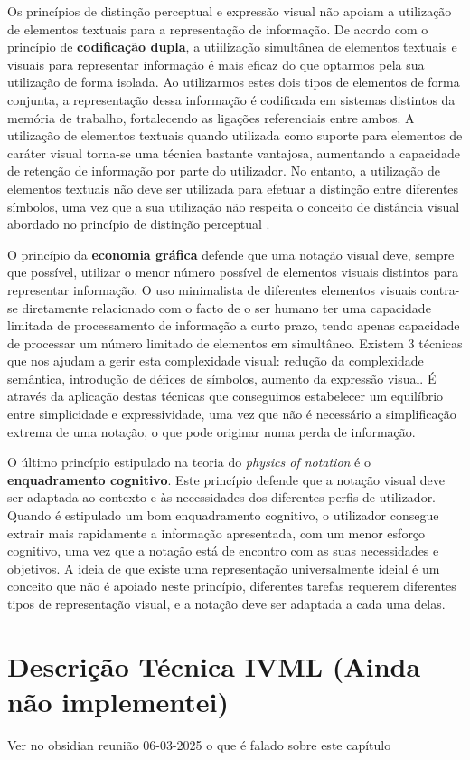 Os princípios de distinção perceptual e expressão visual não apoiam a utilização de elementos textuais para a representação de informação. De acordo com o princípio de \textbf{codificação dupla}, a utiilização simultânea de elementos textuais e visuais para representar informação é mais eficaz do que optarmos pela sua utilização de forma isolada. Ao utilizarmos estes dois tipos de elementos de forma conjunta, a representação dessa informação é codificada em sistemas distintos da memória de trabalho, fortalecendo as ligações referenciais entre ambos. A utilização de elementos textuais quando utilizada como suporte para elementos de caráter visual torna-se uma técnica bastante vantajosa, aumentando a capacidade de retenção de informação por parte do utilizador. No entanto, a utilização de elementos textuais não deve ser utilizada para efetuar a distinção entre diferentes símbolos, uma vez que a sua utilização não respeita o conceito de distância visual abordado no princípio de distinção perceptual \cite{moody2009physics}. 

O princípio da \textbf{economia gráfica} defende que uma notação visual deve, sempre que possível, utilizar o menor número possível de elementos visuais distintos para representar informação. O uso minimalista de diferentes elementos visuais contra-se diretamente relacionado com o facto de o ser humano ter uma capacidade limitada de processamento de informação a curto prazo, tendo apenas capacidade de processar um número limitado de elementos em simultâneo. Existem 3 técnicas que nos ajudam a gerir esta complexidade visual: redução da complexidade semântica, introdução de défices de símbolos, aumento da expressão visual. É através da aplicação destas técnicas que conseguimos estabelecer um equilíbrio entre simplicidade e expressividade, uma vez que não é necessário a simplificação extrema de uma notação, o que pode originar numa perda de informação.

O último princípio estipulado na teoria do \textit{physics of notation} é o \textbf{enquadramento cognitivo}. Este princípio defende que a notação visual deve ser adaptada ao contexto e às necessidades dos diferentes perfis de utilizador. Quando é estipulado um bom enquadramento cognitivo, o utilizador consegue extrair mais rapidamente a informação apresentada, com um menor esforço cognitivo, uma vez que a notação está de encontro com as suas necessidades e objetivos. A ideia de que existe uma representação universalmente ideial é um conceito que não é apoiado neste princípio, diferentes tarefas requerem diferentes tipos de representação visual, e a notação deve ser adaptada a cada uma delas. 

\section{Descrição Técnica IVML (Ainda não implementei)} %
\label{sec:esp_ivml}

Ver no obsidian reunião 06-03-2025 o que é falado sobre este capítulo